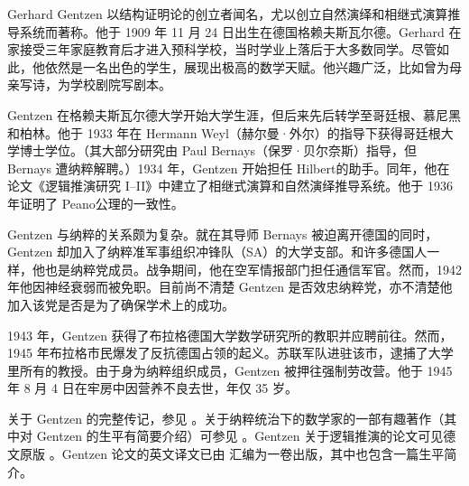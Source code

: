 \documentclass[../../../include/open-logic-section]{subfiles}
\begin{document}



Gerhard Gentzen 以结构证明论的创立者闻名，尤以创立自然演绎和相继式演算推导系统而著称。他于 1909 年 11 月 24 日出生在德国格赖夫斯瓦尔德。Gerhard 在家接受三年家庭教育后才进入预科学校，当时学业上落后于大多数同学。尽管如此，他依然是一名出色的学生，展现出极高的数学天赋。他兴趣广泛，比如曾为母亲写诗，为学校剧院写剧本。

Gentzen 在格赖夫斯瓦尔德大学开始大学生涯，但后来先后转学至哥廷根、慕尼黑和柏林。他于 1933 年在 Hermann Weyl（赫尔曼·外尔）的指导下获得哥廷根大学博士学位。（其大部分研究由 Paul Bernays（保罗·贝尔奈斯）指导，但 Bernays 遭纳粹解聘。）1934 年，Gentzen 开始担任 Hilbert的助手。同年，他在论文《逻辑推演研究 I–II》中建立了相继式演算和自然演绎推导系统。他于 1936 年证明了 Peano公理的一致性。

Gentzen 与纳粹的关系颇为复杂。就在其导师 Bernays 被迫离开德国的同时，Gentzen 却加入了纳粹准军事组织冲锋队（SA）的大学支部。和许多德国人一样，他也是纳粹党成员。战争期间，他在空军情报部门担任通信军官。然而，1942 年他因神经衰弱而被免职。目前尚不清楚 Gentzen 是否效忠纳粹党，亦不清楚他加入该党是否是为了确保学术上的成功。

1943 年，Gentzen 获得了布拉格德国大学数学研究所的教职并应聘前往。然而，1945 年布拉格市民爆发了反抗德国占领的起义。苏联军队进驻该市，逮捕了大学里所有的教授。由于身为纳粹组织成员，Gentzen 被押往强制劳改营。他于 1945 年 8 月 4 日在牢房中因营养不良去世，年仅 35 岁。

\begin{reading}
关于 Gentzen 的完整传记，参见 \citet{Menzler-Trott2007}。关于纳粹统治下的数学家的一部有趣著作（其中对 Gentzen 的生平有简要介绍）可参见 \citet{Segal2014}。Gentzen 关于逻辑推演的论文可见德文原版 \citep{Gentzen1935a,Gentzen1935b}。Gentzen 论文的英文译文已由 \citet{Gentzen1969} 汇编为一卷出版，其中也包含一篇生平简介。
\end{reading}
\end{document}
